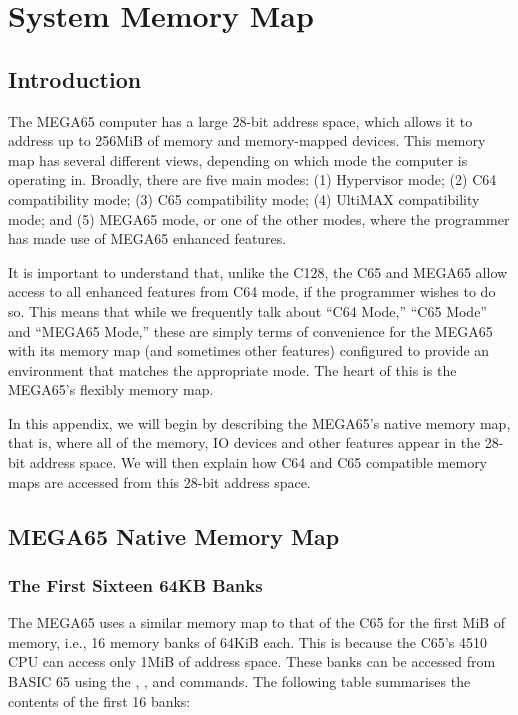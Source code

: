 \chapter{System Memory Map}
\label{cha:memory-map}
\section{Introduction}

The MEGA65 computer has a large 28-bit address space, which allows it
to address up to 256MiB of memory and memory-mapped devices.
This memory map has several different views, depending on which mode
the computer is operating in. Broadly, there are five main modes:
(1) Hypervisor mode; (2) C64 compatibility mode; (3) C65 compatibility mode; (4) UltiMAX
compatibility mode; and (5) MEGA65 mode, or one of the other modes,
where the programmer has made use of MEGA65 enhanced features.

It is important to understand that, unlike the C128, the C65 and
MEGA65 allow access to all enhanced features from C64 mode, if the
programmer wishes to do so.  This means that while we frequently talk
about ``C64 Mode,'' ``C65 Mode'' and ``MEGA65 Mode,'' these are simply
terms of convenience for the MEGA65 with its memory map (and sometimes
other features) configured to provide an environment that matches
the appropriate mode.  The heart of this is the MEGA65's flexibly
memory map.

In this appendix, we will begin by describing the MEGA65's native
memory map, that is, where all of the memory, IO devices and other
features appear in the 28-bit address space. We will then explain how
C64 and C65 compatible memory maps are accessed from this 28-bit
address space.

\newpage

\section{MEGA65 Native Memory Map}

\subsection{The First Sixteen 64KB Banks}

The MEGA65 uses a similar memory map to that of the C65 for the first
MiB of memory, i.e., 16 memory banks of 64KiB each.
This is because the C65's 4510 CPU can access only 1MiB
of address space.  These banks can be accessed from BASIC 65 using the
,
,  and 
commands.  The following table summarises the contents of the first
16 banks:

